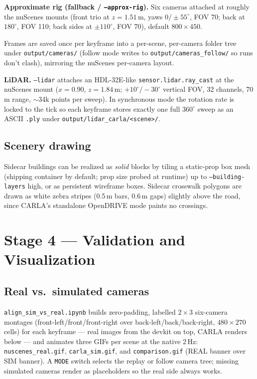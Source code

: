 \documentclass[11pt]{article}
\newcommand{\code}[1]{{\setlength{\fboxsep}{1.5pt}\colorbox{codegray}{\small\texttt{#1}}}}
\newcommand{\file}[1]{\texttt{#1}}
\begin{document}
\textbf{Approximate rig (fallback / \code{--approx-rig}).} Six cameras attached at
roughly the nuScenes mounts (front trio at $z=1.51$\,m, yaws $0/\pm55^\circ$, FOV 70;
back at $180^\circ$, FOV 110; back sides at $\pm110^\circ$, FOV 70), default
$800\times450$.

Frames are saved once per keyframe into a per-scene, per-camera folder tree under
\file{output/cameras/} (follow mode writes to \file{output/cameras\_follow/} so runs
don't clash), mirroring the nuScenes per-camera layout.

\textbf{LiDAR.} \code{--lidar} attaches an HDL-32E-like \code{sensor.lidar.ray\_cast}
at the nuScenes mount ($x=0.90$, $z=1.84$\,m; $+10^\circ/-30^\circ$ vertical FOV, 32
channels, 70\,m range, $\sim$34k points per sweep). In synchronous mode the rotation
rate is locked to the tick so each keyframe stores exactly one full $360^\circ$ sweep as
an ASCII \file{.ply} under \file{output/lidar\_carla/<scene>/}.

\subsection{Scenery drawing}
Sidecar buildings can be realized as \emph{solid} blocks by tiling a static-prop box
mesh (shipping container by default; prop size probed at runtime) up to
\code{--building-layers} high, or as persistent wireframe boxes. Sidecar crosswalk
polygons are drawn as white zebra stripes (0.5\,m bars, 0.6\,m gaps) slightly above the
road, since CARLA's standalone OpenDRIVE mode paints no crossings.

\section{Stage 4 --- Validation and Visualization}
\label{sec:validation}

\subsection{Real vs.\ simulated cameras}
\file{align\_sim\_vs\_real.ipynb} builds zero-padding, labelled $2\times3$ six-camera
montages (front-left/front/front-right over back-left/back/back-right, $480\times270$
cells) for each keyframe --- real images from the devkit on top, CARLA renders below ---
and animates three GIFs per scene at the native 2\,Hz: \file{nuscenes\_real.gif},
\file{carla\_sim.gif}, and \file{comparison.gif} (REAL banner over SIM banner). A
\code{MODE} switch selects the replay or follow camera tree; missing simulated cameras
render as placeholders so the real side always works.
\end{document}
